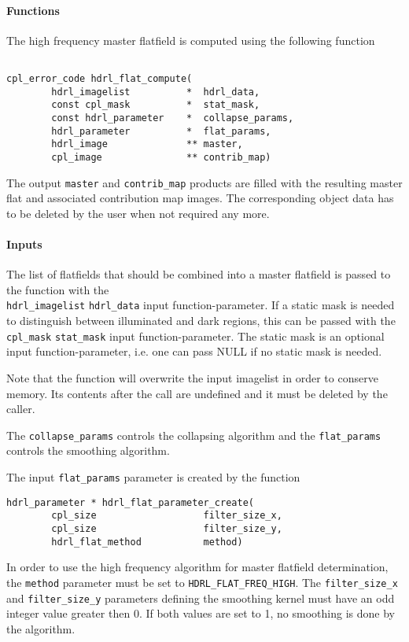 \paragraph{Functions}
\label{flat:algorithms:hf:functions}

The high frequency master flatfield is computed using the following
function

\begin{lstlisting}

cpl_error_code hdrl_flat_compute(
        hdrl_imagelist          *  hdrl_data,
        const cpl_mask          *  stat_mask,
        const hdrl_parameter    *  collapse_params,
        hdrl_parameter          *  flat_params,
        hdrl_image              ** master,
        cpl_image               ** contrib_map)
\end{lstlisting}

The output \verb+master+ and \verb+contrib_map+ products are filled
with the resulting master flat and associated contribution map images.
The corresponding object data has to be deleted by the user when not
required any more.

\paragraph{Inputs}
\label{flat:algorithms:hf:inputs}

The list of flatfields that should be combined into a master flatfield
is passed to the function with the \\
\verb+hdrl_imagelist+
\verb+hdrl_data+ input function-parameter. If a static mask is needed
to distinguish between illuminated and dark regions, this can be
passed with the \verb+cpl_mask+ \verb+stat_mask+ input
function-parameter. The static mask is an optional input
function-parameter, i.e. one can pass NULL if no static mask is
needed.

Note that the function will overwrite the input imagelist in order to
conserve memory. Its contents after the call are undefined and it must
be deleted by the caller.

The \verb+collapse_params+ controls the collapsing algorithm and the
\verb+flat_params+ controls the smoothing algorithm.

The input \verb+flat_params+ parameter is created by the function
\begin{lstlisting}
hdrl_parameter * hdrl_flat_parameter_create(
        cpl_size                   filter_size_x,
        cpl_size                   filter_size_y,
        hdrl_flat_method           method)
\end{lstlisting}
In order to use the high frequency algorithm for master flatfield determination,
the \verb+method+ parameter must be set to \verb+HDRL_FLAT_FREQ_HIGH+. The
\verb+filter_size_x+ and \verb+filter_size_y+ parameters defining the smoothing
kernel must have an odd integer value greater then 0. If both values are
set to 1, no smoothing is done by the algorithm.


